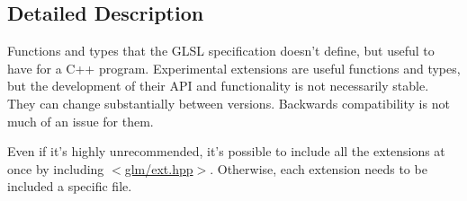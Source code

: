 \subsection{Detailed Description}
Functions and types that the G\-L\-S\-L specification doesn't define, but useful to have for a C++ program. Experimental extensions are useful functions and types, but the development of their A\-P\-I and functionality is not necessarily stable. They can change substantially between versions. Backwards compatibility is not much of an issue for them.

Even if it's highly unrecommended, it's possible to include all the extensions at once by including $<$\hyperlink{ext_8hpp_source}{glm/ext.\-hpp}$>$. Otherwise, each extension needs to be included a specific file. 